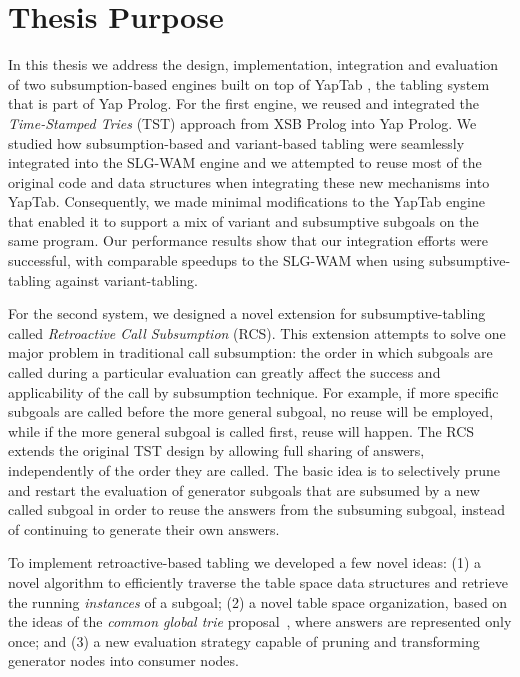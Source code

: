 \section{Thesis Purpose}

In this thesis we address the design, implementation, integration and evaluation of two subsumption-based engines
built on top of YapTab \cite{Rocha-00a}, the tabling system that is part of Yap Prolog. For the first engine, we
reused and integrated the \emph{Time-Stamped Tries} (TST) approach from XSB Prolog into Yap Prolog.
We studied how subsumption-based and variant-based tabling were seamlessly
integrated into the SLG-WAM engine and we attempted to reuse most of the original code and data structures when
integrating these new mechanisms into YapTab.  Consequently, we made minimal modifications to the YapTab engine
that enabled it to support a mix of variant and subsumptive subgoals on the same program.
Our performance results show that our integration efforts were successful, with comparable
speedups to the SLG-WAM when using subsumptive-tabling against variant-tabling.

For the second system, we designed a novel extension for subsumptive-tabling called
\emph{Retroactive Call Subsumption} (RCS).
This extension attempts to solve one major problem in traditional call subsumption: the order in
which subgoals are called during a particular evaluation can greatly affect the success and applicability
of the call by subsumption technique. For example, if more specific subgoals are called before
the more general subgoal, no reuse will be employed, while if the more general subgoal is called first,
reuse will happen. The RCS extends the original TST design by allowing full sharing of answers, independently
of the order they are called. The basic idea is to selectively prune and restart the evaluation of generator
subgoals that are subsumed by a new called subgoal in order to reuse the answers from the subsuming subgoal,
instead of continuing to generate their own answers.

To implement retroactive-based tabling we developed a few novel ideas: (1) a novel algorithm to efficiently
traverse the table space data structures and retrieve the running \emph{instances} of a subgoal; (2) a novel table
space organization, based on the ideas of the \emph{common global trie} proposal~\cite{CostaJ-08}, where answers
are represented only once; and (3) a new evaluation strategy capable of pruning and transforming generator nodes
into consumer nodes.

